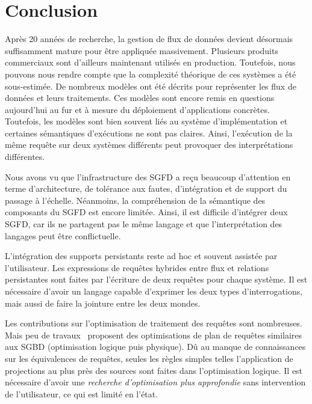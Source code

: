 \section{Conclusion}\label{sec:rw:sgfd:synthese}
Après 20 années de recherche, la gestion de flux de données devient désormais suffisamment mature pour être appliquée massivement. Plusieurs produits commerciaux sont d'ailleurs maintenant utilisés en production. Toutefois, nous pouvons nous rendre compte que la complexité théorique de ces systèmes a été sous-estimée. De nombreux modèles ont été décrits pour représenter les flux de données et leurs traitements. Ces modèles sont encore remis en questions aujourd'hui au fur et à mesure du déploiement d'applications concrètes. Toutefois, les modèles sont bien souvent liés au système d'implémentation et certaines sémantiques d'exécutions ne sont pas claires. Ainsi, l'exécution de la même requête sur deux systèmes différents peut provoquer des interprétations différentes.

Nous avons vu que l'infrastructure des SGFD a reçu beaucoup d'attention en terme d'architecture, de tolérance aux fautes, d'intégration et de support du passage à l'échelle. Néanmoins, la compréhension de la sémantique des composants du SGFD est encore limitée. Ainsi, il est difficile d'intégrer deux SGFD, car ils ne partagent pas le même langage et que l'interprétation des langages peut être conflictuelle.

L'intégration des supports persistants reste ad hoc et souvent assistée par l'utilisateur. Les expressions de requêtes hybrides entre flux et relations persistantes sont faites par l'écriture de deux requêtes pour chaque système. Il est nécessaire d'avoir un langage capable d'exprimer les deux types d'interrogations, mais aussi de faire la jointure entre les deux mondes.

Les contributions sur l'optimisation de traitement des requêtes sont nombreuses. Mais peu de travaux~\cite{Galpin:snee,Kramer:semantics} proposent des optimisations de plan de requêtes similaires aux SGBD (optimisation logique puis physique). Dû au manque de connaissances sur les équivalences de requêtes, seules les règles simples telles l'application de projections au plus près des sources sont faites dans l'optimisation logique. Il est nécessaire d'avoir une \textit{recherche d'optimisation plus approfondie} sans intervention de l'utilisateur, ce qui est limité en l'état.

